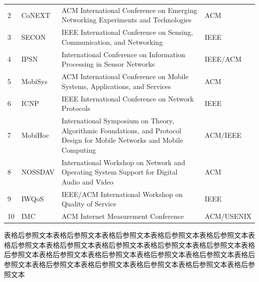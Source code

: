 \documentclass[QingNianC, vlined, timesmathnogreek]{nsfc}
\begin{document}
\begin{longtable}{p{2em} p{4.5em} p{20em} p{6em}}
		2 & CoNEXT & ACM International Conference on Emerging Networking Experiments and Technologies & ACM \\
		3 & SECON & IEEE International Conference on Sensing, Communication, and Networking & IEEE \\
		4 & IPSN & International Conference on Information Processing in Sensor Networks & IEEE/ACM \\
		5 & MobiSys & ACM International Conference on Mobile Systems, Applications, and Services & ACM \\
		6 & ICNP & IEEE International Conference on Network Protocols & IEEE\tablenoteref{tn: 手动跨页表格附注标签IEEE} \\
		7 & MobiHoc & International Symposium on Theory, Algorithmic Foundations, and Protocol Design for Mobile Networks and Mobile Computing & ACM/IEEE \\
		8 & NOSSDAV & International Workshop on Network and Operating System Support for Digital Audio and Video & ACM\tablenoteref{tn: 手动跨页表格附注标签ACM} \\
		9 & IWQoS & IEEE/ACM International Workshop on Quality of Service & IEEE \\
		10 & IMC & ACM Internet Measurement Conference & ACM/USENIX \\
		
		
	\end{longtable}

	表格后参照文本表格后参照文本表格后参照文本表格后参照文本表格后参照文本表格后参照文本表格后参照文本表格后参照文本表格后参照文本表格后参照文本表格后参照文本表格后参照文本表格后参照文本表格后参照文本表格后参照文本表格后参照文本表格后参照文本表格后参照文本表格后参照文本表格后参照文本表格后参照文本

	\newpage
\end{document}
